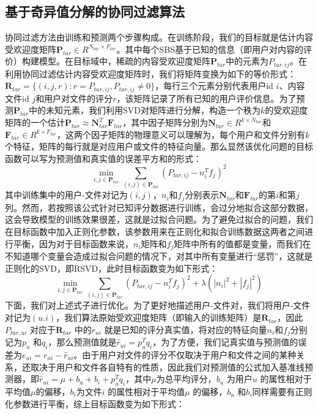\documentclass[bachelor]{seuthesis} %
\begin{document}
\begin{Main}
\section{基于奇异值分解的协同过滤算法}
协同过滤方法由训练和预测两个步骤构成。在训练阶段，我们的目标就是估计内容受欢迎度矩阵$\textbf{P}_{tar}\in R^{N_{tar}\times F_{tar}}$。其中每个SBS基于已知的信息（即用户对内容的评价）构建模型。在目标域中，稀疏的内容受欢迎度矩阵$\textbf{P}_{tar}$中的元素为$P_{tar,ij}$。在利用协同过滤估计内容受欢迎度矩阵时，我们将矩阵变换为如下的等价形式：$\textbf{R}_{tar}=\{(i,j,r):r=P_{tar,ij},P_{tar,ij}\neq0\}$，每行三个元素分别代表用户id $i$、内容文件id $j$和用户对文件的评分$r$，该矩阵记录了所有已知的用户评价信息。为了预测$\textbf{P}_{tar}$中的未知元素，我们利用SVD对矩阵进行分解，构造一个秩为$k$的受欢迎度矩阵的一个估计$\textbf{P}_{tar}\approx \textbf{N}_{tar}^T\textbf{F}_{tar}$，其中因子矩阵分别为$\textbf{N}_{tar}\in R^{k\times N_{tar}}$和$\textbf{F}_{tar}\in R^{k\times F_{tar}}$，这两个因子矩阵的物理意义可以理解为，每个用户和文件分别有$k$个特征，矩阵的每行就是对应用户或文件的特征向量。那么显然该优化问题的目标函数可以写为预测值和真实值的误差平方和的形式：
\begin{equation}
\min_{i,j\in\textbf{P}_{tar}}\sum_{(i,j)\in\textbf{P}_{tar}}(P_{tar,ij}-n_i^Tf_j)^2
\end{equation}
其中训练集中的用户-文件对记为$(i,j)$，$n_i$和$f_j$分别表示$\textbf{N}_{tar}$和$\textbf{F}_{tar}$的第$i$和第$j$列。然而，若按照该公式针对已知评分数据进行训练，会过分地拟合这部分数据，这会导致模型的训练效果很差，这就是过拟合问题。为了避免过拟合的问题，我们在目标函数中加入正则化参数，该参数用来在正则化和拟合训练数据这两者之间进行平衡，因为对于目标函数来说，$n_i$矩阵和$f_j$矩阵中所有的值都是变量，而我们在不知道哪个变量会造成过拟合问题的情况下，对其中所有变量进行“惩罚”，这就是正则化的SVD，即RSVD，此时目标函数变为如下形式：
\begin{equation}
\min_{i,j\in\textbf{P}_{tar}}\sum_{(i,j)\in\textbf{P}_{tar}}(P_{tar,ij}-n_i^Tf_j)^2+\lambda(|n_i|^2+|f_j|^2)
\end{equation}
下面，我们对上述式子进行优化。为了更好地描述用户-文件对，我们将用户-文件对记为$(u.i)$，我们算法原始受欢迎度矩阵（即输入的训练矩阵）是$\textbf{R}_{tar}$，因此$P_{tar,ui}$ 对应于$\textbf{R}_{tar}$ 中的$r_{ui}$ 就是已知的评分真实值，将对应的特征向量$n_i$和$f_j$分别记为$p_u$ 和$q_i$，那么预测值就是$\hat{r}_{ui}=p_u^Tq_i$，为了方便，我们记真实值与预测值的误差为$e_{ui}=r_{ui}-\hat{r}_{ui}$。由于用户对文件的评分不仅取决于用户和文件之间的某种关系，还取决于用户和文件各自特有的性质，因此我们对预测值的公式加入基准线预测器，即$\hat{r}_{ui}=\mu+b_u+b_i+p_u^Tq_i$，其中$\mu$为总平均评分，$b_u$ 为用户$u$ 的属性相对于平均值$\mu$的偏移，$b_i$为文件$i$ 的属性相对于平均值$\mu$ 的偏移，$b_u$ 和$b_i$同样需要有正则化参数进行平衡，综上目标函数变为如下形式：

\end{Main}
\end{document}
